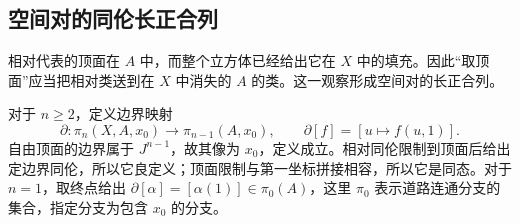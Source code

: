 \subsection{空间对的同伦长正合列}
\label{g2:subsec:0801:04}

相对代表的顶面在 \(A\) 中，而整个立方体已经给出它在 \(X\) 中的填充。因此“取顶面”应当把相对类送到在 \(X\) 中消失的 \(A\) 的类。这一观察形成空间对的长正合列。

对于 \(n\ge2\)，定义边界映射
\[
	\partial:\pi_n(X,A,x_0)\longrightarrow\pi_{n-1}(A,x_0),
	\qquad \partial[f]=[u\mapsto f(u,1)].
\]
自由顶面的边界属于 \(J^{n-1}\)，故其像为 \(x_0\)，定义成立。相对同伦限制到顶面后给出定边界同伦，所以它良定义；顶面限制与第一坐标拼接相容，所以它是同态。对于 \(n=1\)，取终点给出 \(\partial[\alpha]=[\alpha(1)]\in\pi_0(A)\)，这里 \(\pi_0\) 表示道路连通分支的集合，指定分支为包含 \(x_0\) 的分支。

